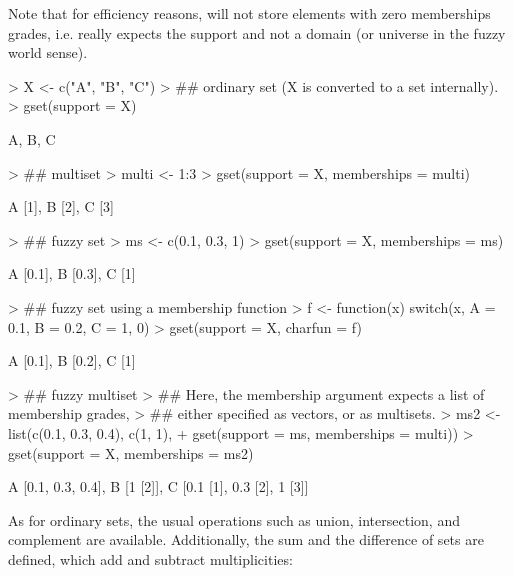 \documentclass[fleqn]{article}
\newcommand{\codefun}[1]{\code{#1()}}
\begin{document}
\noindent Note that for efficiency reasons, \codefun{gset} will not
store elements with zero memberships grades, i.e. really expects the
support and not a domain (or universe in the fuzzy world sense).
\begin{Schunk}
\begin{Sinput}
> X <- c("A", "B", "C")
> ## ordinary set (X is converted to a set internally).
> gset(support = X)
\end{Sinput}
\begin{Soutput}
{A, B, C}
\end{Soutput}
\begin{Sinput}
> ## multiset
> multi <- 1:3
> gset(support = X, memberships = multi)
\end{Sinput}
\begin{Soutput}
{A [1], B [2], C [3]}
\end{Soutput}
\begin{Sinput}
> ## fuzzy set
> ms <- c(0.1, 0.3, 1)
> gset(support = X, memberships = ms)
\end{Sinput}
\begin{Soutput}
{A [0.1], B [0.3], C [1]}
\end{Soutput}
\begin{Sinput}
> ## fuzzy set using a membership function
> f <- function(x) switch(x, A = 0.1, B = 0.2, C = 1, 0)
> gset(support = X, charfun = f)
\end{Sinput}
\begin{Soutput}
{A [0.1], B [0.2], C [1]}
\end{Soutput}
\begin{Sinput}
> ## fuzzy multiset
> ## Here, the membership argument expects a list of membership grades,
> ## either specified as vectors, or as multisets.
> ms2 <- list(c(0.1, 0.3, 0.4), c(1, 1),
+             gset(support = ms, memberships = multi))
> gset(support = X, memberships = ms2)
\end{Sinput}
\begin{Soutput}
{A [{0.1, 0.3, 0.4}], B [{1 [2]}], C [{0.1 [1], 0.3 [2], 1 [3]}]}
\end{Soutput}
\end{Schunk}
As for ordinary sets, the usual operations
such as union, intersection, and complement are available.
Additionally, the sum and the difference of sets are defined,
which add and subtract multiplicities:
\end{document}
